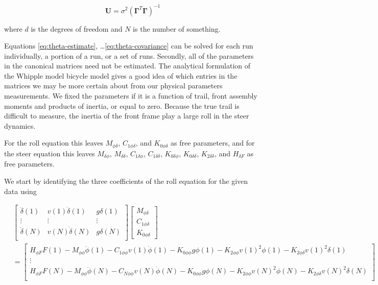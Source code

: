 \documentclass[a4paper]{article}
\begin{document}
\begin{equation}
  \mathbf{U} = \sigma^2 (\mathbf{\Gamma}^T \mathbf{\Gamma})^{-1}
  \label{eq:theta-covariance}
\end{equation}

where $d$ is the degrees of freedom and $N$ is the number of something.

Equations \ref{eq:theta-estimate}, \dots \ref{eq:theta-covariance} can be
solved for each run individually, a portion of a run, or a set of runs.
Secondly, all of the parameters in the canonical matrices need not be
estimated. The analytical formulation of the Whipple model bicycle model
\cite{Meijaard2007} gives a good idea of which entries in the matrices we may
be more certain about from our physical parameters measurements. We fixed the
parameters if it is a function of trail, front assembly moments and products of
inertia, or equal to zero. Because the true trail is difficult to measure, the
inertia of the front frame play a large roll in the steer dynamics.

For the roll equation this leaves $M_{\phi\delta}$, $C_{1\phi\delta}$,
and $K_{0\phi\delta}$ as free parameters, and for the steer equation
this leaves $M_{\delta\phi}$, $M_{\delta\delta}$, $C_{1\delta\phi}$,
$C_{1\delta\delta}$, $K_{0\delta\phi}$, $K_{0\delta\delta}$,
$K_{2\delta\delta}$, and $H_{\delta F}$ as free parameters.

We start by identifying the three coefficients of the roll equation for
the given data using

\begin{align}
  &\begin{bmatrix}
     \ddot{\delta}(1) &
     v(1) \dot{\delta}(1) &
     g \delta(1) \\
     \vdots & \vdots & \vdots\\
     \ddot{\delta}(N) &
     v(N) \dot{\delta}(N) &
     g \delta(N) \\
  \end{bmatrix}
  \begin{bmatrix}
    M_{\phi\delta} \\
    C_{1\phi\delta} \\
    K_{0\phi\delta}
  \end{bmatrix}\\
  &=
  \begin{bmatrix}
    H_{\phi F} F(1)
    - M_{\phi\phi} \ddot{\phi}(1)
    - C_{1\phi\phi} v(1) \dot{\phi}(1)
    - K_{0\phi\phi} g \phi(1)
    - K_{2\phi\phi} v(1)^2 \phi(1)
    - K_{2\phi\delta} v(1)^2 \delta(1) \\
  \vdots\\
    H_{\phi F} F(N)
    - M_{\phi\phi} \ddot{\phi}(N)
    - C_{N\phi\phi} v(N) \dot{\phi}(N)
    - K_{0\phi\phi} g \phi(N)
    - K_{2\phi\phi} v(N)^2 \phi(N)
    - K_{2\phi\delta} v(N)^2 \delta(N) \\
  \end{bmatrix} \nonumber
\end{align}
\end{document}
